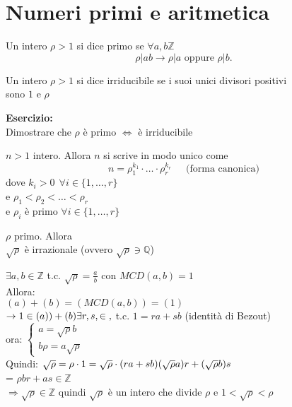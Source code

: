 \documentclass[12px]{article}
\begin{document}
	\section{Numeri primi e aritmetica}
	\begin{defi}
		Un intero $\rho > 1$ si dice primo se  $\forall a,b\mathbb Z$
		 \[
			 \rho|ab \rightarrow \rho|a \text{ oppure } \rho|b
		.\] 
	\end{defi}
	\begin{defi}
		Un intero $\rho>1$ si dice irriducibile se i suoi unici divisori positivi\\ sono  $1$ e $\rho$
	\end{defi}
	\textbf{Esercizio:}\\
	Dimostrare che $\rho$ è primo $\Leftrightarrow$ è irriducibile
	\begin{teo}
		$n>1$ intero. Allora $n$ si scrive in modo unico come
		\[
			n = \rho_1^{k_1}\cdot\ldots\cdot \rho_r^{k_r} \ \ \ \ \ \text{ (forma canonica)}
		\] 
		dove $k_i>0 \ \ \forall i\in\{1,\ldots,r\}$\\
		e $\rho_1<\rho_2<\ldots<\rho_r$\\
		e $\rho_i$ è primo  $\forall i\in \{1,\ldots,r\}$
	\end{teo}
	\begin{teo}
		$\rho$ primo. Allora\\
		$\sqrt \rho $ è irrazionale (ovvero $\sqrt\rho\ni \mathbb Q$)
	\end{teo}
	\begin{dimo}
		$\exists a, b\in \mathbb Z$ t.c.  $\sqrt\rho = \frac a b$ con $MCD(a,b) = 1$\\
		Allora:\\
		 $(a) + (b) = (MCD(a,b)) = (1)$\\
		  $\rightarrow 1\in (a)) + (b)\\
		  \exists r,s,\in\mathbb,$ t.c. $1 = ra + sb$ (identità di Bezout)\\
		  ora:  $ \begin{cases}
		  	a = \sqrt \rho b \\ b\rho = a\sqrt\rho
		  \end{cases}$ \\
		  Quindi:
		  $\sqrt \rho = \rho\cdot 1 = \sqrt \rho\cdot (ra + sb)\\
		  (\sqrt\rho a)r + (\sqrt\rho b)s$\\
		  =  $\rho b r + as\in \mathbb Z$\\
		   $ \Rightarrow \sqrt\rho\in\mathbb Z$ quindi $\sqrt\rho$ è un intero che divide $\rho$ e $1<\sqrt\rho<\rho$
	\end{dimo}
\end{document}
